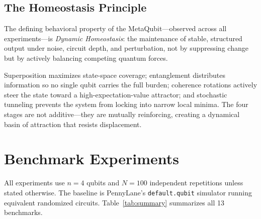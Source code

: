 \documentclass[twocolumn,amsmath,amssymb,prl]{revtex4-2}
\begin{document}
\subsection{The Homeostasis Principle}

The defining behavioral property of the MetaQubit—observed across all
experiments—is \emph{Dynamic Homeostasis}: the maintenance of stable,
structured output under noise, circuit depth, and perturbation, not by
suppressing change but by actively balancing competing quantum forces.

Superposition maximizes state-space coverage; entanglement distributes
information so no single qubit carries the full burden; coherence rotations
actively steer the state toward a high-expectation-value attractor; and
stochastic tunneling prevents the system from locking into narrow local minima.
The four stages are not additive—they are mutually reinforcing, creating a
dynamical basin of attraction that resists displacement.

\section{Benchmark Experiments}
\label{sec:benchmarks}

All experiments use $n = 4$ qubits and $N = 100$ independent repetitions
unless stated otherwise.  The baseline is PennyLane's \texttt{default.qubit}
simulator running equivalent randomized circuits.  Table~\ref{tab:summary}
summarizes all 13 benchmarks.
\end{document}
